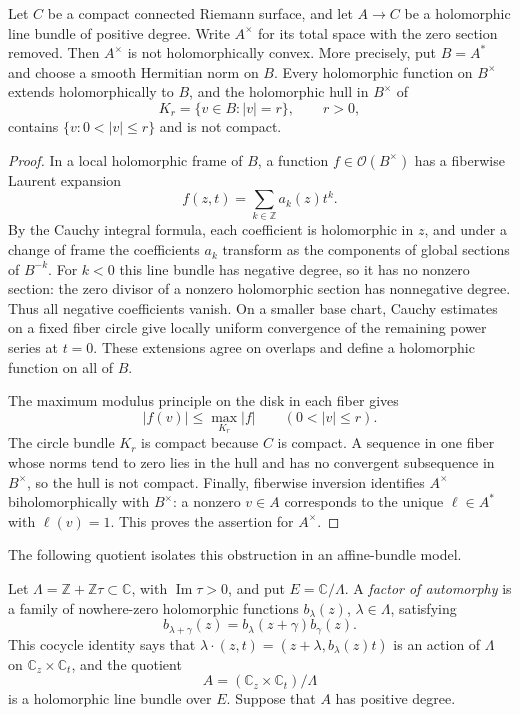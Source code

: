 \begin{lemma}\label{lem:positive-line-puncture-hull}
Let $C$ be a compact connected Riemann surface, and let $A\to C$ be a holomorphic line bundle of positive degree. Write $A^\times$ for its total space with the zero section removed. Then $A^\times$ is not holomorphically convex. More precisely, put $B=A^*$ and choose a smooth Hermitian norm on $B$. Every holomorphic function on $B^\times$ extends holomorphically to $B$, and the holomorphic hull in $B^\times$ of
\[
 K_r=\{v\in B:|v|=r\},\qquad r>0,
\]
contains $\{v:0<|v|\leq r\}$ and is not compact.
\end{lemma}
\begin{proof}
In a local holomorphic frame of $B$, a function $f\in\mathcal O(B^\times)$ has a fiberwise Laurent expansion
\[
 f(z,t)=\sum_{k\in\mathbb Z}a_k(z)t^k.
\]
By the Cauchy integral formula, each coefficient is holomorphic in $z$, and under a change of frame the coefficients $a_k$ transform as the components of global sections of $B^{-k}$. For $k<0$ this line bundle has negative degree, so it has no nonzero section: the zero divisor of a nonzero holomorphic section has nonnegative degree. Thus all negative coefficients vanish. On a smaller base chart, Cauchy estimates on a fixed fiber circle give locally uniform convergence of the remaining power series at $t=0$. These extensions agree on overlaps and define a holomorphic function on all of $B$.

The maximum modulus principle on the disk in each fiber gives
\[
 |f(v)|\leq\max_{K_r}|f|\qquad(0<|v|\leq r).
\]
The circle bundle $K_r$ is compact because $C$ is compact. A sequence in one fiber whose norms tend to zero lies in the hull and has no convergent subsequence in $B^\times$, so the hull is not compact. Finally, fiberwise inversion identifies $A^\times$ biholomorphically with $B^\times$: a nonzero $v\in A$ corresponds to the unique $\ell\in A^*$ with $\ell(v)=1$. This proves the assertion for $A^\times$.
\end{proof}

The following quotient isolates this obstruction in an affine-bundle model.

Let $\Lambda=\mathbb Z+\mathbb Z\tau\subset\mathbb C$, with $\operatorname{Im}\tau>0$, and put $E=\mathbb C/\Lambda$. A \emph{factor of automorphy} is a family of nowhere-zero holomorphic functions $b_\lambda(z)$, $\lambda\in\Lambda$, satisfying
\[
 b_{\lambda+\gamma}(z)=b_\lambda(z+\gamma)b_\gamma(z).
\]
This cocycle identity says that $\lambda\cdot(z,t)=(z+\lambda,b_\lambda(z)t)$ is an action of $\Lambda$ on $\mathbb C_z\times\mathbb C_t$, and the quotient
\[
 A=(\mathbb C_z\times\mathbb C_t)/\Lambda
\]
is a holomorphic line bundle over $E$. Suppose that $A$ has positive degree.

